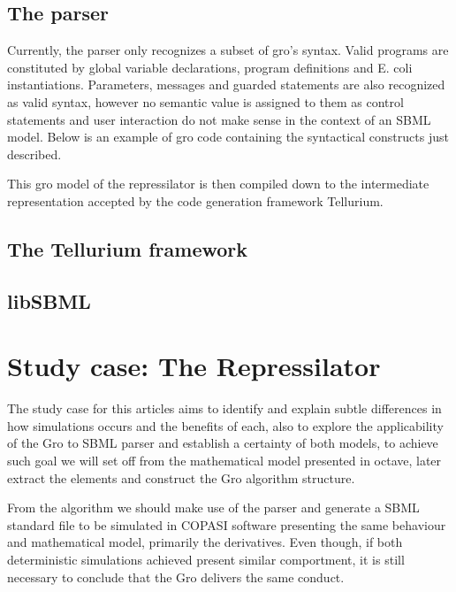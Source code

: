 \documentclass[12pt]{article}
\begin{document}
\subsection{The parser}
    
    Currently, the parser only recognizes a subset of gro's syntax. Valid programs are constituted by global variable declarations, program definitions and E. coli instantiations. Parameters, messages and guarded statements are also recognized as valid syntax, however no semantic value is assigned to them as control statements and user interaction do not make sense in the context of an SBML model. Below is an example of gro code containing the syntactical constructs just described.
    
    
    
    This gro model of the repressilator is then compiled down to the intermediate representation accepted by the code generation framework Tellurium.
    
\subsection{The Tellurium framework}
    \lipsum[1]

\subsection{libSBML}
    \lipsum[1]
    
\section{Study case: The Repressilator}

The study case for this articles aims to identify and explain subtle differences in how simulations occurs and the benefits of each, also to explore the applicability of the Gro to SBML parser and establish a certainty of both models, to achieve such goal we will set off from the mathematical model presented in octave, later extract the elements and construct the Gro algorithm structure. 

From the algorithm we should make use of the parser and generate a SBML standard file to be simulated in COPASI software presenting the same behaviour and mathematical model, primarily the derivatives. Even though, if both deterministic simulations achieved present similar comportment, it is still necessary to conclude that the Gro delivers the same conduct.
\end{document}
